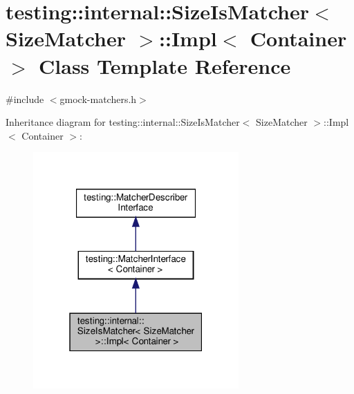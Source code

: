 \hypertarget{classtesting_1_1internal_1_1_size_is_matcher_1_1_impl}{}\section{testing\+:\+:internal\+:\+:Size\+Is\+Matcher$<$ Size\+Matcher $>$\+:\+:Impl$<$ Container $>$ Class Template Reference}
\label{classtesting_1_1internal_1_1_size_is_matcher_1_1_impl}


{\ttfamily \#include $<$gmock-\/matchers.\+h$>$}



Inheritance diagram for testing\+:\+:internal\+:\+:Size\+Is\+Matcher$<$ Size\+Matcher $>$\+:\+:Impl$<$ Container $>$\+:
\nopagebreak
\begin{figure}[H]
\begin{center}
\leavevmode
\includegraphics[width=223pt]{classtesting_1_1internal_1_1_size_is_matcher_1_1_impl__inherit__graph}
\end{center}
\end{figure}



